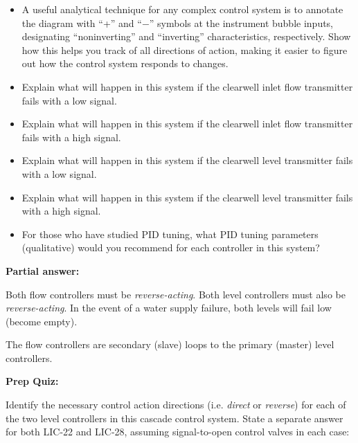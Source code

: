 \begin{itemize}
\item{} A useful analytical technique for any complex control system is to annotate the diagram with ``+'' and ``$-$'' symbols at the instrument bubble inputs, designating ``noninverting'' and ``inverting'' characteristics, respectively.  Show how this helps you track of all directions of action, making it easier to figure out how the control system responds to changes.
\item{} Explain what will happen in this system if the clearwell inlet flow transmitter fails with a low signal.
\item{} Explain what will happen in this system if the clearwell inlet flow transmitter fails with a high signal.
\item{} Explain what will happen in this system if the clearwell level transmitter fails with a low signal.
\item{} Explain what will happen in this system if the clearwell level transmitter fails with a high signal.
\item{} For those who have studied PID tuning, what PID tuning parameters (qualitative) would you recommend for each controller in this system?
\end{itemize}







\noindent
{\bf Partial answer:}

\vskip 10pt

Both flow controllers must be {\it reverse-acting}.  Both level controllers must also be {\it reverse-acting}.  In the event of a water supply failure, both levels will fail low (become empty).







The flow controllers are secondary (slave) loops to the primary (master) level controllers.  








\vfil \eject

\noindent
{\bf Prep Quiz:}

Identify the necessary control action directions (i.e. {\it direct} or {\it reverse}) for each of the two level controllers in this cascade control system.  State a separate answer for both LIC-22 and LIC-28, assuming signal-to-open control valves in each case:


